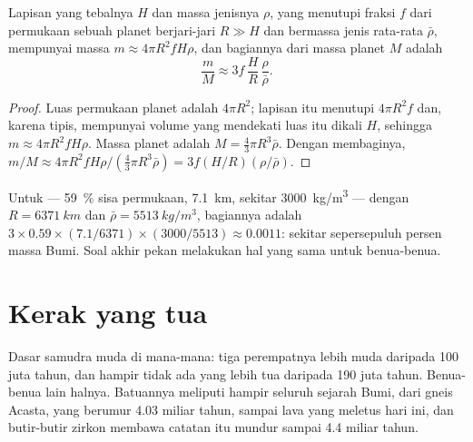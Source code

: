 \begin{proposition}\label{prop:g12:continental-crust:thin-layer}
Lapisan yang tebalnya $H$ dan massa jenisnya $\rho$, yang menutupi fraksi $f$
dari permukaan sebuah planet berjari-jari $R \gg H$ dan bermassa jenis
rata-rata $\bar\rho$, mempunyai massa $m \approx 4\pi R^2 f H \rho$, dan
bagiannya dari massa planet $M$ adalah
\[
  \frac{m}{M} \approx 3 f\,\frac{H}{R}\,\frac{\rho}{\bar\rho}.
\]
\end{proposition}

\begin{proof}
Luas permukaan planet adalah $4\pi R^2$; lapisan itu menutupi $4\pi R^2 f$ dan,
karena tipis, mempunyai volume yang mendekati luas itu dikali $H$, sehingga $m \approx 4\pi R^2
f H \rho$. Massa planet adalah $M = \tfrac{4}{3}\pi R^3 \bar\rho$. Dengan
membaginya, $m/M \approx 4\pi R^2 f H \rho / (\tfrac{4}{3}\pi R^3 \bar\rho) = 3 f (H/R)
(\rho/\bar\rho)$.
\end{proof}

Untuk  --- \qty{59}{\percent} sisa permukaan,
\qty{7.1}{km}, sekitar \qty{3000}{kg/m^3} --- dengan $R = \qty{6371}{km}$ dan
$\bar\rho = \qty{5513}{kg/m^3}$, bagiannya adalah $3 \times 0.59 \times
(7.1/6371) \times (3000/5513) \approx 0.0011$: sekitar sepersepuluh persen
massa Bumi. Soal akhir pekan melakukan hal yang sama untuk benua-benua.

\section{Kerak yang tua}

Dasar samudra muda di mana-mana: tiga perempatnya lebih muda daripada 100 juta
tahun, dan hampir tidak ada yang lebih tua daripada 190 juta tahun. Benua-benua
lain halnya. Batuannya meliputi hampir seluruh sejarah Bumi, dari gneis
Acasta, yang berumur 4.03 miliar tahun, sampai lava yang meletus hari ini, dan
butir-butir zirkon membawa catatan itu mundur sampai 4.4 miliar tahun.

